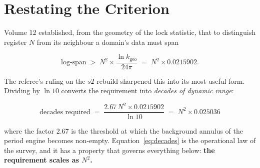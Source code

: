 \documentclass[11pt, letterpaper, openany]{book}
\newcommand{\kgeo}{k_{\mathrm{geo}}}
\begin{document}
\section{Restating the Criterion}

Volume 12 established, from the geometry of the lock statistic, that to distinguish register
$N$ from its neighbour a domain's data must span

\begin{equation}
\text{log-span} \;>\; N^2 \times \frac{\ln \kgeo}{24\pi} \;=\; N^2 \times 0.0215902 .
\label{eq:res}
\end{equation}

The referee's ruling on the $s2$ rebuild sharpened this into its most useful form. Dividing by
$\ln 10$ converts the requirement into \emph{decades of dynamic range}:

\begin{equation}
\boxed{\ \text{decades required} \;=\; \frac{2.67\, N^2 \times 0.0215902}{\ln 10}
\;=\; N^2 \times 0.025036\ }
\label{eq:decades}
\end{equation}

where the factor $2.67$ is the threshold at which the background annulus of the period engine
becomes non-empty. Equation~\ref{eq:decades} is the operational law of the survey, and it has a
property that governs everything below: \textbf{the requirement scales as $N^2$.}
\end{document}
